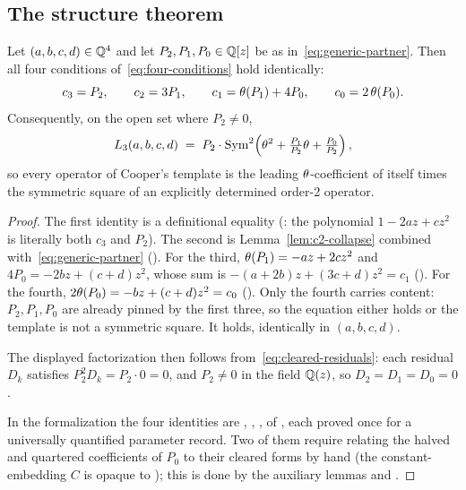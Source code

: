 \subsection{The structure theorem}

\begin{theorem}
\label{thm:sym2-template}
Let $(a,b,c,d)\in\mathbb{Q}^4$ and let $P_2,P_1,P_0 \in \mathbb{Q}[z]$ be as
in~\eqref{eq:generic-partner}. Then all four conditions
of~\eqref{eq:four-conditions} hold identically:
\[
  c_3 = P_2,\qquad c_2 = 3P_1,\qquad
  c_1 = \theta(P_1) + 4P_0,\qquad c_0 = 2\,\theta(P_0).
\]
Consequently, on the open set where $P_2\neq 0$,
\[
  L_3(a,b,c,d) \;=\; P_2 \cdot \operatorname{Sym}^2\!\left(\theta^2
  + \tfrac{P_1}{P_2}\theta + \tfrac{P_0}{P_2}\right),
\]
so every operator of Cooper's template is the leading $\theta$-coefficient
of itself times the symmetric square of an explicitly determined order-2
operator.
\end{theorem}

\begin{proof}
The first identity is a definitional equality
(: the polynomial $1-2az+cz^2$ is literally both
$c_3$ and $P_2$). The second is Lemma~\ref{lem:c2-collapse} combined
with~\eqref{eq:generic-partner} (). For the third,
$\theta(P_1) = -az + 2cz^2$ and $4P_0 = -2bz + (c+d)z^2$, whose sum is
$-(a+2b)z + (3c+d)z^2 = c_1$ (). For the fourth,
$2\theta(P_0) = -bz + (c+d)z^2 = c_0$ (). Only the
fourth carries content: $P_2,P_1,P_0$ are already pinned by the first three,
so the equation either holds or the template is not a symmetric square. It
holds, identically in $(a,b,c,d)$.

The displayed factorization then follows from~\eqref{eq:cleared-residuals}:
each residual $D_k$ satisfies $P_2^2 D_k = P_2 \cdot 0 = 0$, and $P_2 \neq 0$
in the field $\mathbb{Q}(z)$, so $D_2 = D_1 = D_0 = 0$.

In the formalization the four identities are
, , ,
 of ,
each proved once for a universally quantified parameter record. Two of them
require relating the halved and quartered coefficients of $P_0$ to their
cleared forms by hand (the constant-embedding $C$ is opaque to
); this is done by the auxiliary lemmas
 and .
\end{proof}


